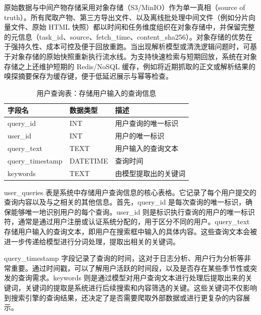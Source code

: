 原始数据与中间产物存储采用对象存储（S3/MinIO）作为单一真相（source of truth）。所有爬取产物、第三方导出文件、以及离线批处理中间文件（例如分片向量文件、原始 HTML 快照）都以时间和任务维度组织在对象存储中，并保留完整的元信息（task\_id、source、fetch\_time、content\_sha256）。对象存储的优势在于强持久性、成本可控及便于回放重跑。当出现解析模型或清洗逻辑问题时，可基于对象存储的原始快照重新执行流水线。为支持快速检索与短期回放，系统在对象存储之上还维护短期的 Redis/NoSQL 缓存，例如将近期抓取的正文或解析结果的嗅探摘要保存为缓存键，便于低延迟展示与幂等检查。


\begin{table}[H]
\centering
\caption{用户查询表：存储用户输入的查询信息}
\label{tab:user_queries}
{\renewcommand{\arraystretch}{1}
\begin{tabular}{|p{3cm}|p{3cm}|p{6cm}|}
\hline
\textbf{字段名} & \textbf{数据类型} & \textbf{描述} \\ \hline
query\_id & INT & 用户查询的唯一标识 \\ \hline
user\_id & INT & 用户的唯一标识 \\ \hline
query\_text & TEXT & 用户输入的查询文本 \\ \hline
query\_timestamp & DATETIME & 查询时间 \\ \hline
keywords & TEXT & 由模型提取出的关键词 \\ \hline
\end{tabular}
}
\end{table}
user\_queries 表是系统中存储用户查询信息的核心表格。它记录了每个用户提交的查询内容以及与之相关的其他信息。首先，query\_id 是每次查询的唯一标识，确保能够唯一地识别用户的每个查询。user\_id 则是标识执行查询的用户的唯一标识符，通常是通过用户注册或认证系统分配的，用于区分不同的用户。query\_text 存储用户输入的查询文本，即用户在搜索框中输入的具体内容。这些查询文本会被进一步传递给模型进行分词处理，提取出相关的关键词。

query\_timestamp 字段记录了查询的时间，这对于日志分析、用户行为分析等非常重要。通过时间戳，可以了解用户活跃的时间段，以及是否存在某些季节性或突发的查询需求。keywords 则是通过模型对用户查询文本进行处理后提取出来的关键词，关键词的提取是系统进行后续搜索和内容筛选的关键。这些关键词不仅影响到搜索引擎的查询结果，还决定了是否需要爬取外部数据或进行更复杂的内容展示。

